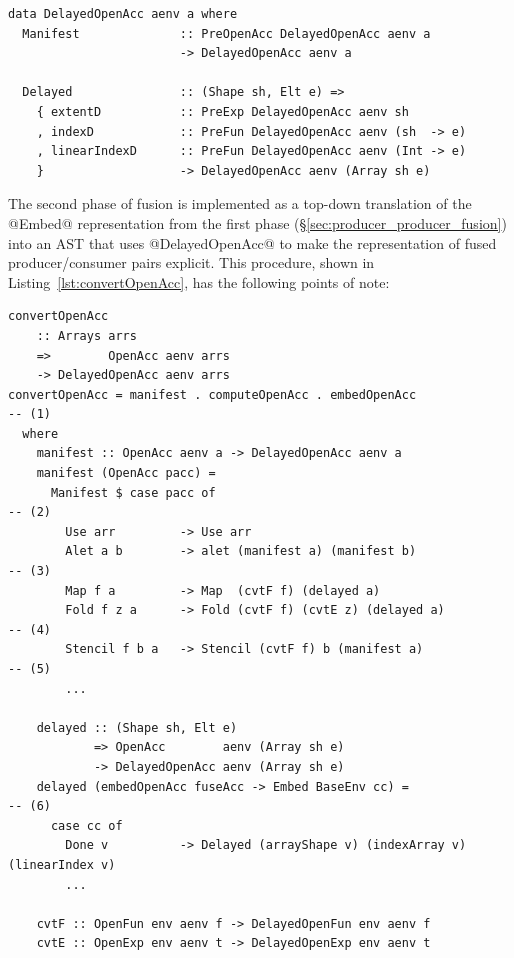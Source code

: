 \begin{lstlisting}[style=haskell_float
    ,name=DelayedOpenAcc
    ,label=lst:DelayedOpenAcc
    ,caption={The type of delayed arrays in Accelerate}]
data DelayedOpenAcc aenv a where
  Manifest              :: PreOpenAcc DelayedOpenAcc aenv a
                        -> DelayedOpenAcc aenv a

  Delayed               :: (Shape sh, Elt e) =>
    { extentD           :: PreExp DelayedOpenAcc aenv sh
    , indexD            :: PreFun DelayedOpenAcc aenv (sh  -> e)
    , linearIndexD      :: PreFun DelayedOpenAcc aenv (Int -> e)
    }                   -> DelayedOpenAcc aenv (Array sh e)
\end{lstlisting}

The second phase of fusion is implemented as a top-down translation of the
@Embed@ representation from the first phase
(\S\ref{sec:producer_producer_fusion}) into an AST that uses @DelayedOpenAcc@ to
make the representation of fused producer/consumer pairs explicit. This
procedure, shown in Listing~\ref{lst:convertOpenAcc}, has the following points
of note:

\begin{lstlisting}[style=haskell_float,
    label=lst:convertOpenAcc,
    caption={Consumer fusion via top-down annotation of the AST}]
convertOpenAcc
    :: Arrays arrs
    =>        OpenAcc aenv arrs
    -> DelayedOpenAcc aenv arrs
convertOpenAcc = manifest . computeOpenAcc . embedOpenAcc                              -- (1)
  where
    manifest :: OpenAcc aenv a -> DelayedOpenAcc aenv a
    manifest (OpenAcc pacc) =
      Manifest $ case pacc of                                                          -- (2)
        Use arr         -> Use arr
        Alet a b        -> alet (manifest a) (manifest b)                              -- (3)
        Map f a         -> Map  (cvtF f) (delayed a)
        Fold f z a      -> Fold (cvtF f) (cvtE z) (delayed a)                          -- (4)
        Stencil f b a   -> Stencil (cvtF f) b (manifest a)                             -- (5)
        ...

    delayed :: (Shape sh, Elt e)
            => OpenAcc        aenv (Array sh e)
            -> DelayedOpenAcc aenv (Array sh e)
    delayed (embedOpenAcc fuseAcc -> Embed BaseEnv cc) =                               -- (6)
      case cc of
        Done v          -> Delayed (arrayShape v) (indexArray v) (linearIndex v)
        ...

    cvtF :: OpenFun env aenv f -> DelayedOpenFun env aenv f
    cvtE :: OpenExp env aenv t -> DelayedOpenExp env aenv t
\end{lstlisting}


